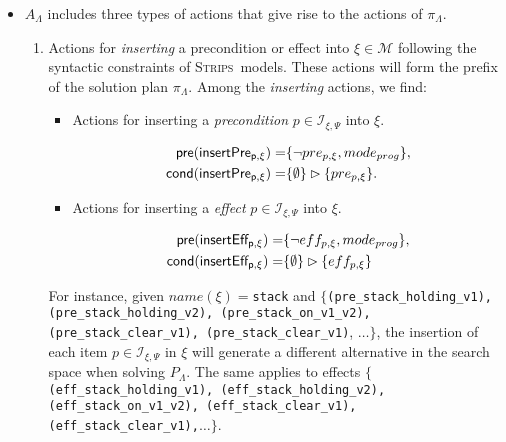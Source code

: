 \documentclass[runningheads]{llncs}
\newcommand{\pre}{\mathsf{pre}}     %
\newcommand{\cond}{\mathsf{cond}}   %
\newcommand{\strips}{\textsc{Strips}}     %
\begin{document}
\begin{itemize}
\item $A_{\Lambda}$ includes three types of actions that give rise to the actions of $\pi_\Lambda$.
\begin{enumerate}
\item Actions for {\em inserting} a precondition or effect into $\xi \in \mathcal{M}$ following the syntactic constraints of \strips\ models. These actions will form the prefix of the solution plan $\pi_\Lambda$. Among the \emph{inserting} actions, we find:
\begin{itemize}
\item Actions for inserting a {\em precondition} $p\in{\mathcal I}_{\xi,\Psi}$ into $\xi$.
\begin{small}
\begin{align*}
\hspace*{7pt}\pre(\mathsf{insertPre_{p,\xi}})=&\{\neg pre_{p,\xi}, mode_{prog}\},\\
\cond(\mathsf{insertPre_{p,\xi}})=&\{\emptyset\}\rhd\{pre_{p,\xi}\}.
\end{align*}
\end{small}

\item Actions for inserting a {\em effect} $p\in{\mathcal I}_{\xi,\Psi}$ into $\xi$.
\begin{small}
\begin{align*}
\hspace*{7pt}\pre(\mathsf{insertEff_{p,\xi}})=&\{\neg eff_{p,\xi}, mode_{prog}\},\\
\cond(\mathsf{insertEff_{p,\xi}})=&\{\emptyset\}\rhd\{eff_{p,\xi}\}
\end{align*}
\end{small}
\end{itemize}

For instance, given $name(\xi)=${\tt{\small stack}} and $\{${\tt{\small (pre\_stack\_holding\_v1)}, {\tt\small (pre\_stack\_holding\_v2)}, {\tt\small(pre\_stack\_on\_v1\_v2)}, {\tt\small(pre\_stack\_clear\_v1)}, {\tt\small(pre\_stack\_clear\_v1)}}, $\ldots \}$, the insertion of each item $p \in {\mathcal I}_{\xi,\Psi}$ in $\xi$ will generate a different alternative in the search space when solving $P_{\Lambda}$. The same applies to effects $\{${\tt{\small (eff\_stack\_holding\_v1)}, {\tt\small(eff\_stack\_holding\_v2)}, {\tt\small (eff\_stack\_on\_v1\_v2)}, {\tt\small (eff\_stack\_clear\_v1)}, {\tt\small (eff\_stack\_clear\_v1),}}$\ldots \}$.

\vspace{0.1cm}


\end{enumerate}
\end{itemize}
\end{document}
